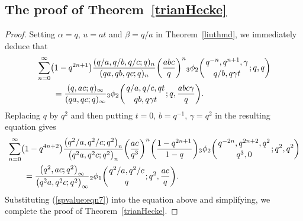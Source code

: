 \documentclass[pdftex]{sigma}
\numberwithin{equation}{section}
\begin{document}
\subsection{The proof of Theorem~\ref{trianHecke}}
\begin{proof}
Setting $\alpha=q$, $u=at$ and $\beta=q/a$ in Theorem~\ref{liuthmd}, we immediately deduce that
\begin{align}
	&\sum_{n=0}^\infty\bigl(1-q^{2n+1}\bigr) \frac{(q/a, q/b, q/c; q)_n}{(qa, qb, qc; q)_n} \biggl(\frac{abc}{q}\biggr)^n {_3\phi_2}\biggl({{q^{-n}, q^{n+1}, \gamma}\atop{q/b, q\gamma t}}; q, q\biggr)\nonumber\\
	&\qquad{}=\frac{(q, ac; q)_\infty}{(qa, qc; q)_\infty}
	{_3\phi_2}\biggl({{q/a, q/c, qt}\atop{qb, q\gamma t}}; q, \frac{abc\gamma}{q}\biggr).\label{trih:eqn2}	
\end{align}	
Replacing $q$ by $q^2$ and then putting $t=0$, $b=q^{-1}$, $\gamma=q^2$ in the resulting equation gives 		
	\begin{align*}
		&	\sum_{n=0}^\infty \bigl(1-q^{4n+2}\bigr) \frac{\bigl(q^2/a, q^2/c; q^2\bigr)_n}{\bigl(q^2a, q^2c; q^2\bigr)_n} \biggl(\frac{ac}{q^3}\biggr)^n
		 \biggl(\frac{1-q^{2n+1}}{1-q}\biggr){_3\phi_2}\biggl({{q^{-2n}, q^{2n+2}, q^2}\atop{q^3, 0}}; q^2, q^2\biggr)\\
		&\qquad{}=\frac{\bigl(q^2, ac; q^2\bigr)_\infty}{\bigl(q^2a, q^2c; q^2\bigr)_\infty}
		{_2\phi_1}\biggl({{q^2/a, q^2/c}\atop{q}}; q^2, \frac{ac}{q}\biggr).
	\end{align*}
	Substituting (\ref{spvalue:eqn7}) into the equation above and simplifying, we complete the proof of Theorem~\ref{trianHecke}.
\end{proof}
\end{document}
